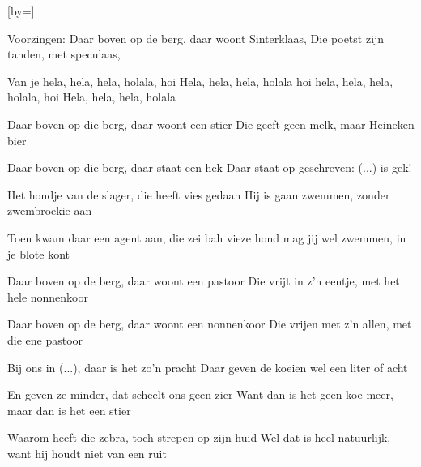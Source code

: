  

[by=]




\beginverse
Voorzingen: Daar boven op de berg, \brk {}
daar woont Sinterklaas, \brk {}
Die poetst zijn tanden, \brk {}
met speculaas, \brk {}
\endverse


\beginchorus
    Van je hela, hela, hela, holala, hoi
    Hela, hela, hela, holala hoi
    hela, hela, hela, holala, hoi
    Hela, hela, hela, holala
\endchorus


\beginverse
Daar boven op die berg, daar woont een stier
Die geeft geen melk, maar Heineken bier
\endverse

\beginverse
{}
Daar boven op die berg, daar staat een hek
Daar staat op geschreven: (...) is gek!

\endverse

\beginverse

Het hondje van de slager, die heeft vies gedaan
Hij is gaan zwemmen, zonder zwembroekie aan
\endverse

\beginverse

Toen kwam daar een agent aan, die zei bah vieze hond
mag jij wel zwemmen, in je blote kont
\endverse

\beginverse

Daar boven op de berg, daar woont een pastoor
Die vrijt in z'n eentje, met het hele nonnenkoor
\endverse

\beginverse

Daar boven op de berg, daar woont een nonnenkoor
Die vrijen met z'n allen, met die ene pastoor
\endverse

\beginverse
{}
Bij ons in (...), daar is het zo'n pracht
Daar geven de koeien wel een liter of acht
\endverse

\beginverse

En geven ze minder, dat scheelt ons geen zier
Want dan is het geen koe meer, maar dan is het een stier
\endverse

\beginverse
Waarom heeft die zebra, toch strepen op zijn huid
Wel dat is heel natuurlijk, want hij houdt niet van een ruit
\endverse




\endsong
